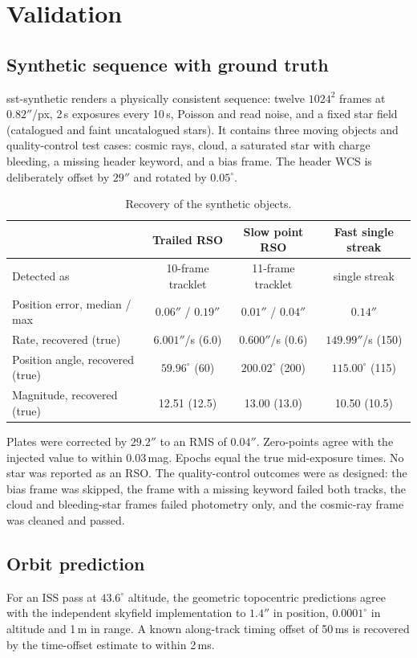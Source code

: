\documentclass[11pt,a4paper]{article}
\newcommand{\brkus}{\textunderscore\allowbreak}
\newcommand{\code}[1]{{\ttfamily\let\_\brkus #1}}
\begin{document}
\section{Validation}

\subsection{Synthetic sequence with ground truth}
\code{sst-synthetic} renders a physically consistent sequence: twelve $1024^2$ frames at
$0.82''$/px, 2\,s exposures every 10\,s, Poisson and read noise, and a fixed star field
(catalogued and faint uncatalogued stars). It contains three moving objects and quality-control
test cases: cosmic rays, cloud, a saturated star with charge bleeding, a missing header
keyword, and a bias frame. The header WCS is deliberately offset by $29''$ and rotated by
$0.05^\circ$.

\begin{table}[H]
\centering\small
\begin{tabular}{@{}lccc@{}}
\toprule
& \textbf{Trailed RSO} & \textbf{Slow point RSO} & \textbf{Fast single streak} \\
\midrule
Detected as & 10-frame tracklet & 11-frame tracklet & single streak \\
Position error, median / max & $0.06''$ / $0.19''$ & $0.01''$ / $0.04''$ & $0.14''$ \\
Rate, recovered (true) & $6.001''$/s (6.0) & $0.600''$/s (0.6) & $149.99''$/s (150) \\
Position angle, recovered (true) & $59.96^\circ$ (60) & $200.02^\circ$ (200) & $115.00^\circ$ (115) \\
Magnitude, recovered (true) & 12.51 (12.5) & 13.00 (13.0) & 10.50 (10.5) \\
\bottomrule
\end{tabular}
\caption{Recovery of the synthetic objects.}
\end{table}

Plates were corrected by $29.2''$ to an RMS of $0.04''$. Zero-points agree with the injected
value to within 0.03\,mag. Epochs equal the true mid-exposure times. No star was reported as an
RSO. The quality-control outcomes were as designed: the bias frame was skipped, the frame with a
missing keyword failed both tracks, the cloud and bleeding-star frames failed photometry only,
and the cosmic-ray frame was cleaned and passed.

\subsection{Orbit prediction}
For an ISS pass at $43.6^\circ$ altitude, the geometric topocentric predictions agree with the
independent skyfield implementation to $1.4''$ in position, $0.0001^\circ$ in altitude and 1\,m
in range. A known along-track timing offset of 50\,ms is recovered by the time-offset estimate to
within 2\,ms.
\end{document}
